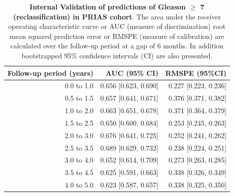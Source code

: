 \begin{table}[!htb]
\small\sf\centering
\caption{\textbf{Internal Validation of predictions of Gleason $\geq$ 7 (reclassification) in PRIAS cohort}. The area under the receiver operating characteristic curve or AUC (measure of discrimination) root mean squared prediction error or RMSPE (measure of calibration) are calculated over the follow-up period at a gap of 6 months. In addition bootstrapped 95\% confidence intervals (CI) are also presented.}
\label{tab:AUC_PE_PRIAS}
\begin{tabular}{r|r|r}
\hline
\hline
Follow-up period (years) & AUC (95\% CI) & RMSPE (95\%CI)\\ 
\hline
0.0 to 1.0 & 0.656 [0.623, 0.690] & 0.227 [0.223, 0.236]\\
0.5 to 1.5 & 0.657 [0.641, 0.671] & 0.376 [0.371, 0.382]\\
1.0 to 2.0 & 0.663 [0.651, 0.678] & 0.371 [0.364, 0.379]\\
1.5 to 2.5 & 0.650 [0.600, 0.684] & 0.253 [0.245, 0.263]\\
2.0 to 3.0 & 0.676 [0.641, 0.725] & 0.252 [0.241, 0.262]\\
2.5 to 3.5 & 0.689 [0.629, 0.732] & 0.238 [0.224, 0.251]\\
3.0 to 4.0 & 0.652 [0.614, 0.709] & 0.273 [0.263, 0.285]\\
3.5 to 4.5 & 0.625 [0.591, 0.663] & 0.338 [0.326, 0.349]\\
4.0 to 5.0 & 0.623 [0.587, 0.657] & 0.338 [0.325, 0.350]\\
\hline
\end{tabular}	
\end{table}

